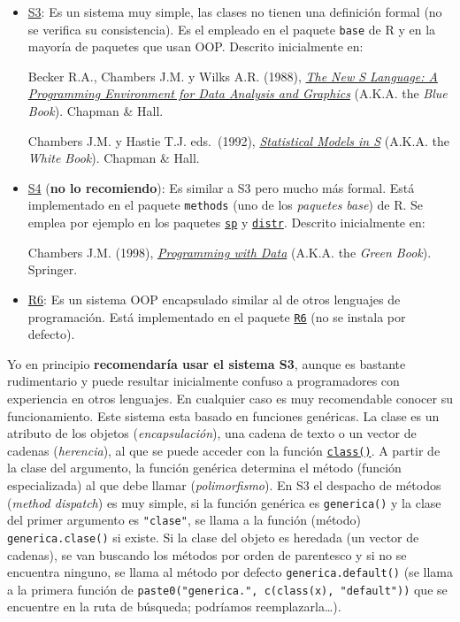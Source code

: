 \documentclass[
]{book}
\theoremstyle{break}
\theoremstyle{nonumberplain}
\begin{document}
\begin{itemize}
\item
  \href{https://adv-r.hadley.nz/s3.html}{S3}: Es un sistema muy simple, las clases no tienen una definición formal (no se verifica su consistencia). Es el empleado en el paquete \texttt{base} de R y en la mayoría de paquetes que usan OOP.
  Descrito inicialmente en:

  Becker R.A., Chambers J.M. y Wilks A.R. (1988), \emph{\href{https://www.amazon.es/dp/053409192X}{The New S Language: A Programming Environment for Data Analysis and Graphics}} (A.K.A. the \emph{Blue Book}). Chapman \& Hall.

  Chambers J.M. y Hastie T.J. eds.~(1992), \emph{\href{https://www.amazon.com/gp/product/0534167659}{Statistical Models in S}} (A.K.A. the \emph{White Book}). Chapman \& Hall.
\item
  \href{https://adv-r.hadley.nz/s4.html}{S4} (\textbf{no lo recomiendo}): Es similar a S3 pero mucho más formal. Está implementado en el paquete \texttt{methods} (uno de los \emph{paquetes base}) de R. Se emplea por ejemplo en los paquetes \href{https://github.com/edzer/sp/}{\texttt{sp}} y \href{http://distr.r-forge.r-project.org/}{\texttt{distr}}.
  Descrito inicialmente en:

  Chambers J.M. (1998), \emph{\href{https://www.amazon.com/gp/product/0387985034}{Programming with Data}} (A.K.A. the \emph{Green Book}). Springer.
\item
  \href{https://adv-r.hadley.nz/r6.html}{R6}: Es un sistema OOP encapsulado similar al de otros lenguajes de programación. Está implementado en el paquete \href{https://r6.r-lib.org}{\texttt{R6}} (no se instala por defecto).
\end{itemize}

Yo en principio \textbf{recomendaría usar el sistema S3}, aunque es bastante rudimentario y puede resultar inicialmente confuso a programadores con experiencia en otros lenguajes.
En cualquier caso es muy recomendable conocer su funcionamiento.
Este sistema esta basado en funciones genéricas.
La clase es un atributo de los objetos (\emph{encapsulación}), una cadena de texto o un vector de cadenas (\emph{herencia}), al que se puede acceder con la función \href{https://rdrr.io/r/base/class.html}{\texttt{class()}}.
A partir de la clase del argumento, la función genérica determina el método (función especializada) al que debe llamar (\emph{polimorfismo}).
En S3 el despacho de métodos (\emph{method dispatch}) es muy simple, si la función genérica es \texttt{generica()} y la clase del primer argumento es \texttt{"clase"}, se llama a la función (método) \texttt{generica.clase()} si existe.
Si la clase del objeto es heredada (un vector de cadenas), se van buscando los métodos por orden de parentesco y si no se encuentra ninguno, se llama al método por defecto \texttt{generica.default()} (se llama a la primera función de \texttt{paste0("generica.",\ c(class(x),\ "default"))} que se encuentre en la ruta de búsqueda; podríamos reemplazarla\ldots).
\end{document}
